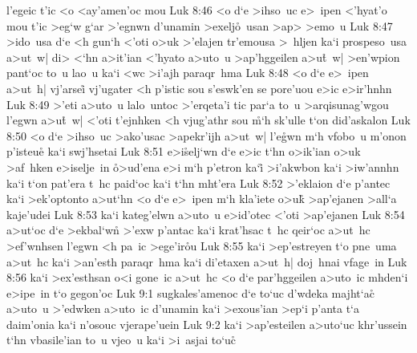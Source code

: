 l'egeic
t'ic
<o
<ay'amen'oc
mou\bibvsend
\vs Luk 8:46
<o
d`e
>ihso~uc
e>~ipen
<'hyat'o
mou
t'ic
>eg`w
g`ar
>'egnwn
d'unamin
>exelj\r{o}~usan
>ap>
>emo~u\bibvsend
\vs Luk 8:47
>ido~usa
d`e
<h
gun`h
<'oti
o>uk
>'elajen
tr'emousa
>~hljen
ka`i
prospeso~usa
a>ut~w|
di>
<`hn
a>it'ian
<'hyato
a>uto~u
>ap'hggeilen
a>u\r{t}~w|
>en'wpion
pant`oc
to~u
lao~u
ka`i
<wc
>i'ajh
paraqr~hma\bibvsend
\vs Luk 8:48
<o
d`e
e>~ipen
a>ut~h|
vj'arsei\r{}
vj'ugater
<h
p'istic
sou
s'eswk'en
se
pore'uou
e>ic
e>ir'hnhn\bibvsend
\vs Luk 8:49
>'eti
a>uto~u
lalo~untoc
>'erqeta'i
tic
par`a
to~u
>arqisunag'wgou
l'egwn
a>u\r{t}~w|
<'oti
t'ejnhken
<h
vjug'athr
sou
\r{m}`h
sk'ulle
t`on
did'askalon\bibvsend
\vs Luk 8:50
<o
d`e
>ihso~uc
>ako'usac
>apekr'ijh
a>ut~w|
l'e\r{g}wn
m`h
vfobo~u
m'onon
p'isteu\r{e}
ka`i
swj'hsetai\bibvsend
\vs Luk 8:51
e>i\r{s}elj`wn
d`e
e>ic
t`hn
o>ik'ian
o>uk
>af~hken
e>iselje~in
\r{o}>ud'ena
e>i
m`h
p'etron
ka`i\r{}
>i'akwbon
ka`i
>iw'annhn
ka`i
t`on
pat'era
t~hc
paid`oc
ka`i
t`hn
mht'era\bibvsend
\vs Luk 8:52
>'eklaion
d`e
p'antec
ka`i
>ek'optonto
a>ut`hn
<o
d`e
e>~ipen
m`h
kla'iete
o>u\r{k}
>ap'ejanen
>all`a
kaje'udei\bibvsend
\vs Luk 8:53
ka`i
kateg'elwn
a>uto~u
e>id'otec
<'oti
>ap'ejanen\bibvsend
\vs Luk 8:54
a>ut`oc
d`e
>ekbal`wn\r{}
>'exw
p'antac
ka`i
krat'hsac
t~hc
qeir`oc
a>ut~hc
>ef'wnhsen
l'egwn
<h
pa~ic
>ege'ir\r{o}u\bibvsend
{}
\vs Luk 8:55
ka`i
>ep'estreyen
t`o
pne~uma
a>ut~hc
ka`i
>an'esth
paraqr~hma
ka`i
di'etaxen
a>ut~h|
doj~hnai
vfage~in\bibvsend
\vs Luk 8:56
ka`i
>ex'esthsan
o<i
gone~ic
a>ut~hc
<o
d`e
par'hggeilen
a>uto~ic
mhden`i
e>ipe~in
t`o
gegon'oc\bibvsend
\vs Luk 9:1
sugkales'amenoc
d`e
to`uc
d'wdeka
majht`ac\r{}
a>uto~u
>'edwken
a>uto~ic
d'unamin
ka`i
>exous'ian
>ep`i
p'anta
t`a
daim'onia
ka`i
n'osouc
vjerape'uein\bibvsend
\vs Luk 9:2
ka`i
>ap'esteilen
a>uto`uc
khr'ussein
t`hn
vbasile'ian
to~u
vjeo~u
ka`i
>i~asjai
to`uc\r{}
